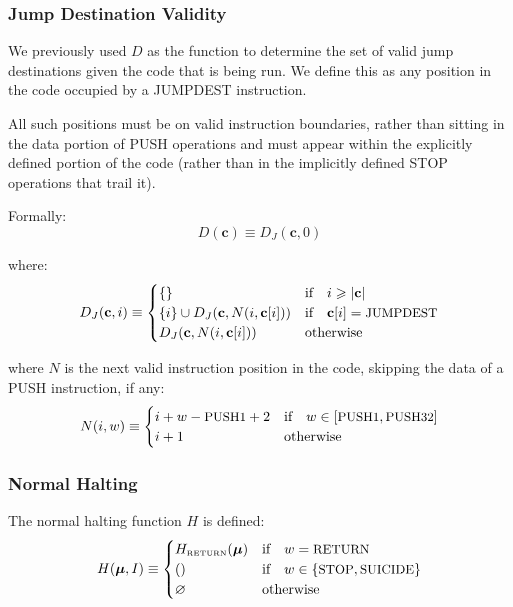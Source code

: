 \documentclass[9pt,oneside]{amsart}
\begin{document}
\begin{multicols}{2}
\subsubsection{Jump Destination Validity}

We previously used $D$ as the function to determine the set of valid jump destinations given the code that is being run. We define this as any position in the code occupied by a {\small JUMPDEST} instruction.

All such positions must be on valid instruction boundaries, rather than sitting in the data portion of {\small PUSH} operations and must appear within the explicitly defined portion of the code (rather than in the implicitly defined {\small STOP} operations that trail it).

Formally:
\begin{equation}
D(\mathbf{c}) \equiv D_J(\mathbf{c}, 0)
\end{equation}

where:
\begin{equation}
D_J(\mathbf{c}, i) \equiv \begin{cases}
\{\} & \text{if} \quad i \geqslant |\mathbf{c}|  \\
\{ i \} \cup D_J(\mathbf{c}, N(i, \mathbf{c}[i])) & \text{if} \quad \mathbf{c}[i] = \text{\small JUMPDEST} \\
D_J(\mathbf{c}, N(i, \mathbf{c}[i])) & \text{otherwise} \\
\end{cases}
\end{equation}

where $N$ is the next valid instruction position in the code, skipping the data of a {\small PUSH} instruction, if any:
\begin{equation}
N(i, w) \equiv \begin{cases}
i + w - \text{\small PUSH1} + 2 & \text{if} \quad w \in [\text{\small PUSH1}, \text{\small PUSH32}] \\
i + 1 & \text{otherwise} \end{cases}
\end{equation}

\subsubsection{Normal Halting}

The normal halting function $H$ is defined:
\begin{equation}
H(\boldsymbol{\mu}, I) \equiv \begin{cases}
H_{\text{\tiny RETURN}}(\boldsymbol{\mu}) & \text{if} \quad w = \text{\small RETURN} \\
() & \text{if} \quad w \in \{ \text{\small STOP}, \text{\small SUICIDE} \} \\
\varnothing & \text{otherwise}
\end{cases}
\end{equation}


\end{multicols}
\end{document}
